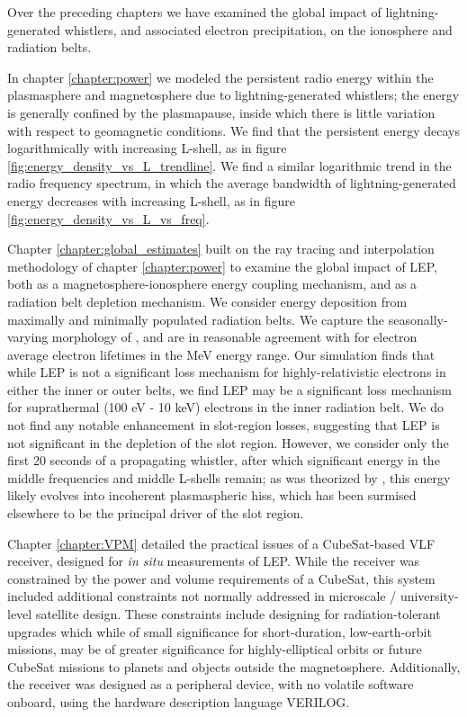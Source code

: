 Over the preceding chapters we have examined the global impact of lightning-generated whistlers, and associated electron precipitation, on the ionosphere and radiation belts. 

In chapter \ref{chapter:power} we modeled the persistent radio energy within the plasmasphere and magnetosphere due to lightning-generated whistlers; the energy is generally confined by the plasmapause, inside which there is little variation with respect to geomagnetic conditions. We find that the persistent energy decays logarithmically with increasing L-shell, as in figure \ref{fig:energy_density_vs_L_trendline}. We find a similar logarithmic trend in the radio frequency spectrum, in which the average bandwidth of lightning-generated energy decreases with increasing L-shell, as in figure \ref{fig:energy_density_vs_L_vs_freq}.

Chapter \ref{chapter:global_estimates} built on the ray tracing and interpolation methodology of chapter \ref{chapter:power} to examine the global impact of LEP, both as a magnetosphere-ionosphere energy coupling mechanism, and as a radiation belt depletion mechanism. We consider energy deposition from maximally and minimally populated radiation belts. We capture the seasonally-varying morphology of \cite{Gemelos2009}, and are in reasonable agreement with \cite{Meredith2007} for electron average electron lifetimes in the MeV energy range. Our simulation finds that while LEP is not a significant loss mechanism for highly-relativistic electrons in either the inner or outer belts, we find LEP may be a significant loss mechanism for suprathermal (100 eV - 10 keV) electrons in the inner radiation belt. We do not find any notable enhancement in slot-region losses, suggesting that LEP is not significant in the depletion of the slot region. However, we consider only the first 20 seconds of a propagating whistler, after which significant energy in the middle frequencies and middle L-shells remain; as was theorized by \cite{Bortnik2005}, this energy likely evolves into incoherent plasmaspheric hiss, which has been surmised elsewhere to be the principal driver of the slot region.

Chapter \ref{chapter:VPM} detailed the practical issues of a CubeSat-based VLF receiver, designed for \emph{in situ} measurements of LEP. While the receiver was constrained by the power and volume requirements of a CubeSat, this system included additional constraints not normally addressed in microscale / university-level satellite design. These constraints include designing for radiation-tolerant upgrades which while of small significance for short-duration, low-earth-orbit missions, may be of greater significance for highly-elliptical orbits or future CubeSat missions to planets and objects outside the magnetosphere. Additionally, the receiver was designed as a peripheral device, with no volatile software onboard, using the hardware description language VERILOG.

